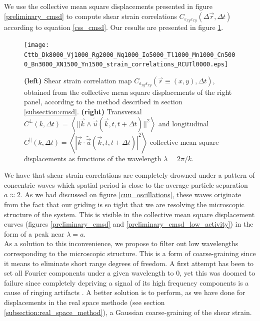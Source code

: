 \documentclass[class=report, float=false, crop=false]{standalone}
\begin{document}
\newpage
{}

We use the collective mean square displacements presented in figure \ref{preliminary_cmsd} to compute shear strain correlations $C_{\varepsilon_{xy}\varepsilon_{xy}}(\Delta \vec{r}, \Delta t)$ according to equation \ref{css_cmsd}. Our results are presented in figure \ref{non_filtered_css}.

\begin{figure}[H]
\centering
\texttt{[image: Cttb\_Dk8000\_Vj1000\_Rg2000\_Nq1000\_Io5000\_Tl1000\_Mn1000\_Cn5000\_Bn3000\_XN1500\_Yn1500\_strain\_correlations\_RCUTl0000.eps]}
\caption{\textbf{(left)} Shear strain correlation map  $C_{\varepsilon_{xy}\varepsilon_{xy}}(\vec{r} \equiv (x, y), \Delta t)$, obtained from the collective mean square displacements of the right panel, according to the method described in section \ref{subsection:cmsd}. \textbf{(right)} Transversal $C^{\perp}(k, \Delta t) = \left<||\vec{k}\wedge\tilde{\vec{u}}(\vec{k}, t, t + \Delta t)||^2\right>$  and longitudinal $C^{||}(k, \Delta t) = \left<|\vec{k}\cdot\tilde{\vec{u}}(\vec{k}, t, t + \Delta t)|^2\right>$ collective mean square displacements as functions of the wavelength $\lambda = 2\pi/k$.}
\label{non_filtered_css}
\end{figure}

We have that shear strain correlations are completely drowned under a pattern of concentric waves which spatial period is close to the average particle separation $a \approx 2$. As we had discussed on figure \ref{cuu_oscillations}, these waves originate from the fact that our griding is so tight that we are resolving the microscopic structure of the system. This is visible in the collective mean square displacement curves (figures \ref{preliminary_cmsd} and \ref{preliminary_cmsd_low_activity}) in the form of a peak near $\lambda = a$.\\

As a solution to this inconvenience, we propose to filter out low wavelengths corresponding to the microscopic structure. This is a form of coarse-graining since it means to eliminate short range degrees of freedom. A first attempt has been to set all Fourier components under a given wavelength to 0, yet this was doomed to failure since completely depriving a signal of its high frequency components is a cause of ringing artifacts \cite{ringing}. A better solution is to perform, as we have done for displacements in the real space methode (see section \ref{subsection:real_space_method}), a Gaussian coarse-graining of the shear strain.\\
\end{document}

